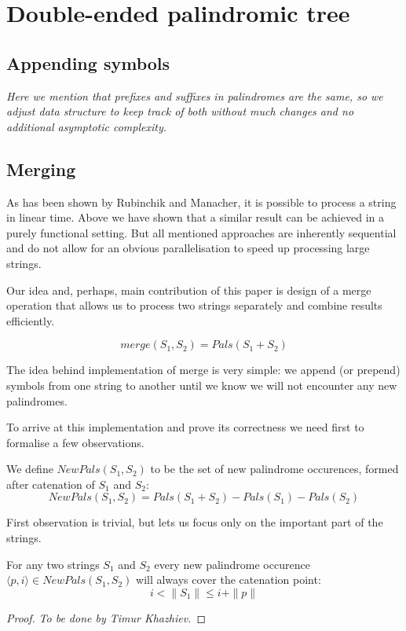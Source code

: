 \section{Double-ended palindromic tree}

\subsection{Appending symbols}

\emph{Here we mention that prefixes and suffixes
in palindromes are the same, so we adjust data structure
to keep track of both without much changes and no
additional asymptotic complexity.}

\subsection{Merging}

As has been shown by Rubinchik and Manacher, it is possible
to process a string in linear time. Above we have shown that
a similar result can be achieved in a purely functional setting.
But all mentioned approaches are inherently sequential and
do not allow for an obvious parallelisation to speed up processing
large strings.

Our idea and, perhaps, main contribution of this paper is
design of a merge operation that allows
us to process two strings separately and combine results
efficiently.

$$
merge(S_1, S_2) = Pals(S_1 + S_2)
$$

The idea behind implementation of merge is very simple:
we append (or prepend) symbols from one string to another
until we know we will not encounter any new palindromes.

To arrive at this implementation and prove its correctness
we need first to formalise a few observations.

We define $NewPals(S_1, S_2)$ to be the set of
new palindrome occurences, formed after catenation of $S_1$ and $S_2$:
\[
NewPals(S_1, S_2) = Pals(S_1 + S_2) - Pals(S_1) - Pals(S_2)
\]

First observation is trivial,
but lets us focus only on the important part of the strings.

\begin{lemma}
\label{lemma-newpals-cover}
  For any two strings $S_1$ and $S_2$
  every new palindrome occurence
  $\langle p, i \rangle \in NewPals(S_1, S_2)$
  will always cover the catenation point:
  \[
  i < \|S_1\| \le i + \|p\|
  \]
\end{lemma}
\begin{proof}
  \emph{To be done by Timur Khazhiev.}
\end{proof}

